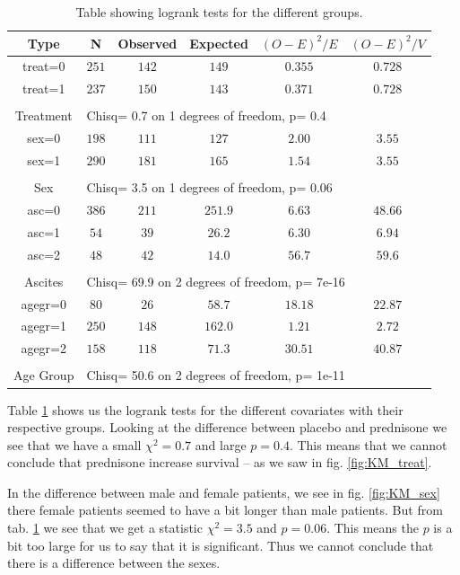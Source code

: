 \documentclass[a4paper,norsk, 10pt]{article}
\begin{document}
\begin{table}[!htb]
\centering
\begin{tabular}{c|c|c|c|c|c}
Type & N & Observed & Expected & $(O-E)^2/E$ & $(O-E)^2/V$ \\
\hline 
treat=0 & $251$ & $142$ &  $149$&  $0.355$&  $0.728$ \\
treat=1 & $237$ & $150$ &  $143$&  $0.371$&  $0.728$ \\
\hline\\
Treatment & \multicolumn{5}{l}{Chisq= 0.7  on 1 degrees of freedom, p= 0.4}\\
\hline
\hline
sex=0 & $198$ & $111$ &  $127$&  $2.00$&  $3.55$ \\
sex=1 & $290$ & $181$ &  $165$&  $1.54$&  $3.55$ \\
\hline\\
Sex & \multicolumn{5}{l}{Chisq= 3.5  on 1 degrees of freedom, p= 0.06}\\
\hline
\hline
asc=0 & $386$ & $211$ &  $251.9$&  $6.63$&  $48.66$ \\
asc=1 & $54$ & $39$ &  $26.2$&  $6.30$&  $6.94$ \\
asc=2 & $48$ & $42$ &  $14.0$&  $56.7$&  $59.6$ \\
\hline\\
Ascites & \multicolumn{5}{l}{Chisq= 69.9  on 2 degrees of freedom, p= 7e-16 }\\
\hline
\hline
agegr=0 & $80$ & $26$ &  $58.7$&  $18.18$&  $22.87$ \\
agegr=1 & $250$ & $148$ &  $162.0$&  $1.21$&  $2.72$ \\
agegr=2 & $158$ & $118$ &  $71.3$&  $30.51$&  $40.87$ \\
\hline\\
Age Group & \multicolumn{5}{l}{Chisq= 50.6  on 2 degrees of freedom, p= 1e-11}\\
\end{tabular}
\caption{Table showing logrank tests for the different groups.}\label{tab:logrank}
\end{table}


Table \ref{tab:logrank} shows us the logrank tests for the different covariates with their respective groups. Looking at the difference between placebo and prednisone we see that we have a small $\chi^2 = 0.7$ and large $p=0.4$. This means that we cannot conclude that prednisone increase survival -- as we saw in fig. \ref{fig:KM_treat}.

In the difference between male and female patients, we see in fig. \ref{fig:KM_sex} there female patients seemed to have a bit longer than male patients. But from tab. \ref{tab:logrank} we see that we get a statistic $\chi^2 = 3.5$ and $p=0.06$. This means the $p$ is a bit too large for us to say that it is significant. Thus we cannot conclude that there is a difference between the sexes.
\end{document}
